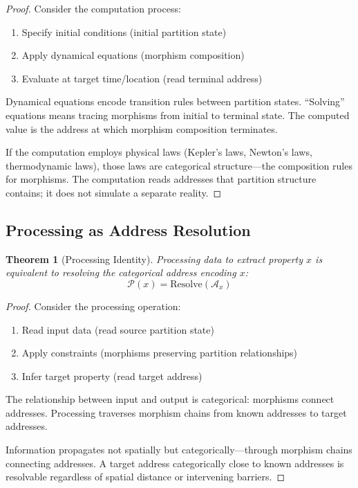 \documentclass[10pt,twocolumn]{article}
\theoremstyle{plain}
\newtheorem{theorem}{Theorem}[section]
\theoremstyle{definition}
\theoremstyle{remark}
\newcommand{\Proc}{\mathcal{P}}
\begin{document}
\begin{proof}
Consider the computation process:
\begin{enumerate}[label=(\roman*)]
\item Specify initial conditions (initial partition state)
\item Apply dynamical equations (morphism composition)
\item Evaluate at target time/location (read terminal address)
\end{enumerate}
Dynamical equations encode transition rules between partition states. ``Solving'' equations means tracing morphisms from initial to terminal state. The computed value is the address at which morphism composition terminates.

If the computation employs physical laws (Kepler's laws, Newton's laws, thermodynamic laws), those laws are categorical structure---the composition rules for morphisms. The computation reads addresses that partition structure contains; it does not simulate a separate reality.
\end{proof}

\subsection{Processing as Address Resolution}

\begin{theorem}[Processing Identity]
\label{thm:proc_identity}
Processing data to extract property $x$ is equivalent to resolving the categorical address encoding $x$:
\begin{equation}
\Proc(x) = \mathrm{Resolve}(\mathcal{A}_x)
\label{eq:proc_resolve}
\end{equation}
\end{theorem}

\begin{proof}
Consider the processing operation:
\begin{enumerate}[label=(\roman*)]
\item Read input data (read source partition state)
\item Apply constraints (morphisms preserving partition relationships)
\item Infer target property (read target address)
\end{enumerate}
The relationship between input and output is categorical: morphisms connect addresses. Processing traverses morphism chains from known addresses to target addresses.

Information propagates not spatially but categorically---through morphism chains connecting addresses. A target address categorically close to known addresses is resolvable regardless of spatial distance or intervening barriers.
\end{proof}
\end{document}
